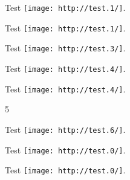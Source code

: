 Test \texttt{[image: http://test.1/]}.

Test \texttt{[image: http://test.1/]}.

Test \texttt{[image: http://test.3/]}.

Test \texttt{[image: http://test.4/]}.

Test \texttt{[image: http://test.4/]}.

5

Test \texttt{[image: http://test.6/]}.

Test \texttt{[image: http://test.0/]}.

Test \texttt{[image: http://test.0/]}.

